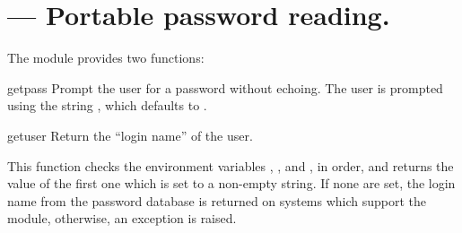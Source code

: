 \section{
         --- Portable password reading.}




The  module provides two functions:


\begin{funcdesc}{getpass}{}
  Prompt the user for a password without echoing.  The user is
  prompted using the string , which defaults to
  .
\end{funcdesc}


\begin{funcdesc}{getuser}{}
  Return the ``login name'' of the user.

  This function checks the environment variables ,
  ,  and , in order, and
  returns the value of the first one which is set to a non-empty
  string.  If none are set, the login name from the password database
  is returned on systems which support the  module,
  otherwise, an exception is raised.
\end{funcdesc}
